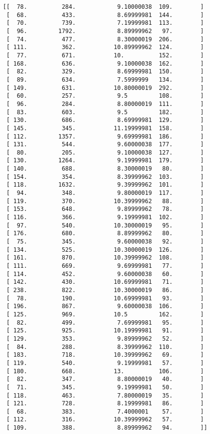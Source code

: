 \documentclass[11pt]{article}
\begin{document}
    \begin{Verbatim}[commandchars=\\\{\}]
[[  78.          284.            9.10000038  109.        ]
 [  68.          433.            8.69999981  144.        ]
 [  70.          739.            7.19999981  113.        ]
 [  96.         1792.            8.89999962   97.        ]
 [  74.          477.            8.30000019  206.        ]
 [ 111.          362.           10.89999962  124.        ]
 [  77.          671.           10.          152.        ]
 [ 168.          636.            9.10000038  162.        ]
 [  82.          329.            8.69999981  150.        ]
 [  89.          634.            7.5999999   134.        ]
 [ 149.          631.           10.80000019  292.        ]
 [  60.          257.            9.5         108.        ]
 [  96.          284.            8.80000019  111.        ]
 [  83.          603.            9.5         182.        ]
 [ 130.          686.            8.69999981  129.        ]
 [ 145.          345.           11.19999981  158.        ]
 [ 112.         1357.            9.69999981  186.        ]
 [ 131.          544.            9.60000038  177.        ]
 [  80.          205.            9.10000038  127.        ]
 [ 130.         1264.            9.19999981  179.        ]
 [ 140.          688.            8.30000019   80.        ]
 [ 154.          354.            8.39999962  103.        ]
 [ 118.         1632.            9.39999962  101.        ]
 [  94.          348.            9.80000019  117.        ]
 [ 119.          370.           10.39999962   88.        ]
 [ 153.          648.            9.89999962   78.        ]
 [ 116.          366.            9.19999981  102.        ]
 [  97.          540.           10.30000019   95.        ]
 [ 176.          680.            8.89999962   80.        ]
 [  75.          345.            9.60000038   92.        ]
 [ 134.          525.           10.30000019  126.        ]
 [ 161.          870.           10.39999962  108.        ]
 [ 111.          669.            9.69999981   77.        ]
 [ 114.          452.            9.60000038   60.        ]
 [ 142.          430.           10.69999981   71.        ]
 [ 238.          822.           10.30000019   86.        ]
 [  78.          190.           10.69999981   93.        ]
 [ 196.          867.            9.60000038  106.        ]
 [ 125.          969.           10.5         162.        ]
 [  82.          499.            7.69999981   95.        ]
 [ 125.          925.           10.19999981   91.        ]
 [ 129.          353.            9.89999962   52.        ]
 [  84.          288.            8.39999962  110.        ]
 [ 183.          718.           10.39999962   69.        ]
 [ 119.          540.            9.19999981   57.        ]
 [ 180.          668.           13.          106.        ]
 [  82.          347.            8.80000019   40.        ]
 [  71.          345.            9.19999981   50.        ]
 [ 118.          463.            7.80000019   35.        ]
 [ 121.          728.            8.19999981   86.        ]
 [  68.          383.            7.4000001    57.        ]
 [ 112.          316.           10.39999962   57.        ]
 [ 109.          388.            8.89999962   94.        ]]

    \end{Verbatim}
\end{document}
